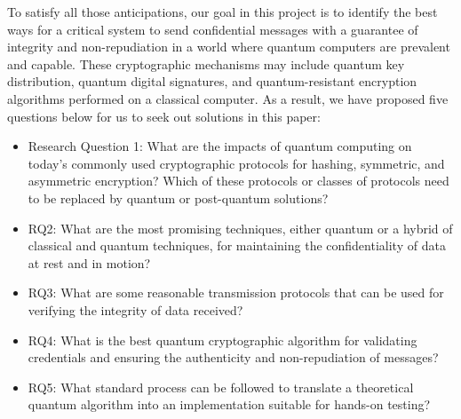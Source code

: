 \documentclass[sigconf]{acmart}
\begin{document}
To satisfy all those anticipations, our goal in this project is to identify the best ways for a critical system to send confidential messages with a guarantee of integrity and non-repudiation in a world where quantum computers are prevalent and capable. These cryptographic mechanisms may include quantum key distribution, quantum digital signatures, and quantum-resistant encryption algorithms performed on a classical computer. As a result, we have proposed five questions below for us to seek out solutions in this paper:
\begin{itemize}
\item Research Question 1: What are the impacts of quantum computing on today's commonly used cryptographic protocols for hashing, symmetric, and asymmetric encryption? Which of these protocols or classes of protocols need to be replaced by quantum or post-quantum solutions?
\item RQ2: What are the most promising techniques, either quantum or a hybrid of classical and quantum techniques, for maintaining the confidentiality of data at rest and in motion?
\item RQ3: What are some reasonable transmission protocols that can be used for verifying the integrity of data received?
\item RQ4: What is the best quantum cryptographic algorithm for validating credentials and ensuring the authenticity and non-repudiation of messages?
\item RQ5: What standard process can be followed to translate a theoretical quantum algorithm into an implementation suitable for hands-on testing?
\end{itemize} %

\end{document}
